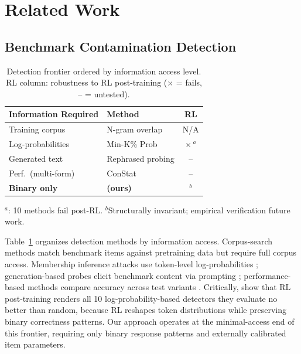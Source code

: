 \section{Related Work}\label{sec:background}

\subsection{Benchmark Contamination Detection}\label{sec:contamination_related}

\begin{table}[t]
\centering
\small
\caption{Detection frontier ordered by information access level. RL column: robustness to RL post-training ($\times$ = fails, -- = untested).}
\label{tab:frontier}
\begin{tabular}{@{}llc@{}}
\toprule
Information Required & Method & RL \\
\midrule
Training corpus & N-gram overlap \citep{dodge2021} & N/A \\
Log-probabilities & Min-K\% Prob \citep{minkprob2024} & $\times$\,$^{a}$ \\
Generated text & Rephrased probing \citep{golchin2024} & -- \\
Perf.\ (multi-form) & ConStat \citep{constat2024} & -- \\
\textbf{Binary only} & \textbf{\irtfit{} (ours)} & $^{b}$ \\
\bottomrule
\end{tabular}

{\raggedright\scriptsize $^{a}$\citet{wang2025fragility}: 10 methods fail post-RL.
$^{b}$Structurally invariant; empirical verification future work.\par}
\end{table}

Table~\ref{tab:frontier} organizes detection methods by information access.
Corpus-search methods match benchmark items against pretraining data \citep{dodge2021, magar2022} but require full corpus access.
Membership inference attacks use token-level log-probabilities \citep{minkprob2024, deng2024}; generation-based probes elicit benchmark content via prompting \citep{golchin2024, oren2024}; performance-based methods compare accuracy across test variants \citep{constat2024, codec2026}.
Critically, \citet{wang2025fragility} show that RL post-training renders all 10 log-probability-based detectors they evaluate no better than random, because RL reshapes token distributions while preserving binary correctness patterns.
Our approach operates at the minimal-access end of this frontier, requiring only binary response patterns and externally calibrated item parameters.

